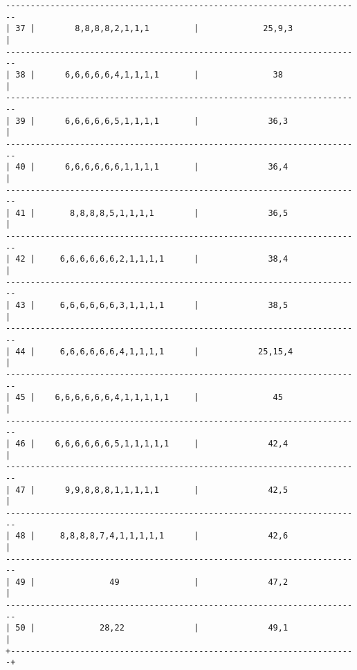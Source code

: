 \documentclass[11pt]{article}
\begin{document}
\begin{verbatim}
------------------------------------------------------------------------
| 37 |        8,8,8,8,2,1,1,1         |             25,9,3             |
------------------------------------------------------------------------
| 38 |      6,6,6,6,6,4,1,1,1,1       |               38               |
------------------------------------------------------------------------
| 39 |      6,6,6,6,6,5,1,1,1,1       |              36,3              |
------------------------------------------------------------------------
| 40 |      6,6,6,6,6,6,1,1,1,1       |              36,4              |
------------------------------------------------------------------------
| 41 |       8,8,8,8,5,1,1,1,1        |              36,5              |
------------------------------------------------------------------------
| 42 |     6,6,6,6,6,6,2,1,1,1,1      |              38,4              |
------------------------------------------------------------------------
| 43 |     6,6,6,6,6,6,3,1,1,1,1      |              38,5              |
------------------------------------------------------------------------
| 44 |     6,6,6,6,6,6,4,1,1,1,1      |            25,15,4             |
------------------------------------------------------------------------
| 45 |    6,6,6,6,6,6,4,1,1,1,1,1     |               45               |
------------------------------------------------------------------------
| 46 |    6,6,6,6,6,6,5,1,1,1,1,1     |              42,4              |
------------------------------------------------------------------------
| 47 |      9,9,8,8,8,1,1,1,1,1       |              42,5              |
------------------------------------------------------------------------
| 48 |     8,8,8,8,7,4,1,1,1,1,1      |              42,6              |
------------------------------------------------------------------------
| 49 |               49               |              47,2              |
------------------------------------------------------------------------
| 50 |             28,22              |              49,1              |
+----------------------------------------------------------------------+
\end{verbatim}

\newpage
\end{document}
